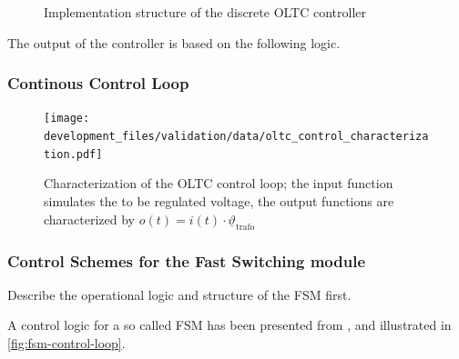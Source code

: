 \begin{figure}[htb!]
        \centering
        \caption[Implementation structure of the discrete OLTC controller]{Implementation structure of the discrete OLTC controller}
        \label{fig:discrete-oltc-implementation}
\end{figure}

The output of the controller is based on the following logic.


% 

\subsubsection{Continous Control Loop}

\begin{figure}[htb!]
        \centering
        \texttt{[image: development\_files/validation/data/oltc\_control\_characterization.pdf]}
        \caption[Characterization of the OLTC control loops]{Characterization of the OLTC control loop; the input function simulates the to be regulated voltage, the output functions are characterized by $o(t)=i(t) \cdot \underline{\vartheta}_\mathrm{trafo}$}
        \label{fig:oltc-control-characterization}
\end{figure}

\subsubsection{Control Schemes for the Fast Switching module}
Describe the operational logic and structure of the \acf{FSM} first.

A control logic for a so called \acs{FSM} has been presented from \textcite{burlakin_2024}, and illustrated in \autoref{fig:fsm-control-loop}.


